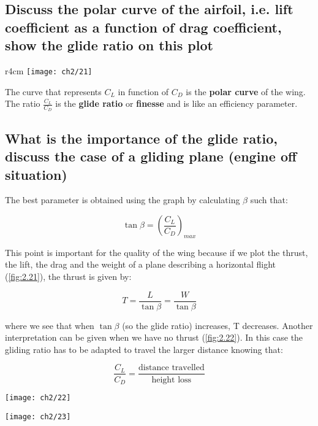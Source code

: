 \documentclass[british,french,11pt, a4paper, openany]{article}
\begin{document}
\subsection{Discuss the polar curve of the airfoil, i.e. lift coefficient as a function of drag	coefficient, show the glide ratio on this plot}
\begin{wrapfigure}[10]{r}{4cm}
	\vspace{-5mm}
	\texttt{[image: ch2/21]}
\end{wrapfigure}
The curve that represents $C_L$ in function of $C_D$ is the \textbf{polar curve} of the wing. The ratio $\frac{C_L}{C_D}$ is the \textbf{glide ratio} or \textbf{finesse} and is like an efficiency parameter. 

\subsection{What is the importance of the glide ratio, discuss the case of a gliding plane	(engine off situation)}
The best parameter is obtained using the graph by calculating $\beta$ such that: 

\begin{equation}
\tan \beta = \left(\frac{C_L}{C_D}\right)_{max}
\end{equation}						

This point is important for the quality of the wing because if we plot the thrust, the lift, the drag and the weight of a plane describing a horizontal flight (\autoref{fig:2.21}), the thrust is given by:

\begin{equation}
T = \frac{L}{\tan \beta} = \frac{W}{\tan \beta}
\end{equation}

where we see that when $\tan \beta$ (so the glide ratio) increases, T decreases. Another interpretation can be given when we have no thrust (\autoref{fig:2.22}). In this case the gliding ratio has to be adapted to travel the larger distance knowing that:

\begin{equation}
\frac{C_L}{C_D} = \frac{\mbox{distance travelled}}{\mbox{height loss}}
\end{equation}

\begin{center}
	\begin{minipage}{0.3\textwidth}
		\texttt{[image: ch2/22]}
		\label{fig:2.21}
	\end{minipage}
	\begin{minipage}{0.5\textwidth}
		\texttt{[image: ch2/23]}
		\label{fig:2.22}
	\end{minipage}
\end{center}
\end{document}
